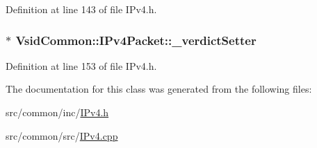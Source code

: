 Definition at line 143 of file I\-Pv4.\-h.

\hypertarget{class_vsid_common_1_1_i_pv4_packet_a71b0a5f7928f5ea0d6b5e1ab720f54cf}{
\subsubsection[{\-\_\-verdict\-Setter}]{$\ast$ Vsid\-Common\-::\-I\-Pv4\-Packet\-::\-\_\-verdict\-Setter\hspace{0.3cm}{\ttfamily [protected]}}}\label{class_vsid_common_1_1_i_pv4_packet_a71b0a5f7928f5ea0d6b5e1ab720f54cf}


Definition at line 153 of file I\-Pv4.\-h.



The documentation for this class was generated from the following files\-:\begin{DoxyCompactItemize}
\item 
src/common/inc/\hyperlink{_i_pv4_8h}{I\-Pv4.\-h}\item 
src/common/src/\hyperlink{_i_pv4_8cpp}{I\-Pv4.\-cpp}\end{DoxyCompactItemize}
